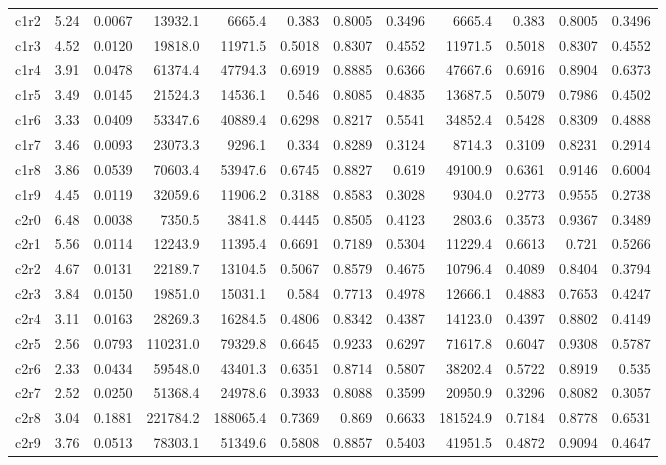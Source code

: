 \begin{landscape}
\begin{longtable}[]{@{}lrrrrrrrrrrr@{}}
c1r2 & 5.24 & 0.0067 & 13932.1 & 6665.4 & 0.383 & 0.8005 & 0.3496 & 6665.4 & 0.383 & 0.8005 & 0.3496 \\
c1r3 & 4.52 & 0.0120 & 19818.0 & 11971.5 & 0.5018 & 0.8307 & 0.4552 & 11971.5 & 0.5018 & 0.8307 & 0.4552 \\
c1r4 & 3.91 & 0.0478 & 61374.4 & 47794.3 & 0.6919 & 0.8885 & 0.6366 & 47667.6 & 0.6916 & 0.8904 & 0.6373 \\
c1r5 & 3.49 & 0.0145 & 21524.3 & 14536.1 & 0.546 & 0.8085 & 0.4835 & 13687.5 & 0.5079 & 0.7986 & 0.4502 \\
c1r6 & 3.33 & 0.0409 & 53347.6 & 40889.4 & 0.6298 & 0.8217 & 0.5541 & 34852.4 & 0.5428 & 0.8309 & 0.4888 \\
c1r7 & 3.46 & 0.0093 & 23073.3 & 9296.1 & 0.334 & 0.8289 & 0.3124 & 8714.3 & 0.3109 & 0.8231 & 0.2914 \\
c1r8 & 3.86 & 0.0539 & 70603.4 & 53947.6 & 0.6745 & 0.8827 & 0.619 & 49100.9 & 0.6361 & 0.9146 & 0.6004 \\
c1r9 & 4.45 & 0.0119 & 32059.6 & 11906.2 & 0.3188 & 0.8583 & 0.3028 & 9304.0 & 0.2773 & 0.9555 & 0.2738 \\
c2r0 & 6.48 & 0.0038 & 7350.5 & 3841.8 & 0.4445 & 0.8505 & 0.4123 & 2803.6 & 0.3573 & 0.9367 & 0.3489 \\
c2r1 & 5.56 & 0.0114 & 12243.9 & 11395.4 & 0.6691 & 0.7189 & 0.5304 & 11229.4 & 0.6613 & 0.721 & 0.5266 \\
c2r2 & 4.67 & 0.0131 & 22189.7 & 13104.5 & 0.5067 & 0.8579 & 0.4675 & 10796.4 & 0.4089 & 0.8404 & 0.3794 \\
c2r3 & 3.84 & 0.0150 & 19851.0 & 15031.1 & 0.584 & 0.7713 & 0.4978 & 12666.1 & 0.4883 & 0.7653 & 0.4247 \\
c2r4 & 3.11 & 0.0163 & 28269.3 & 16284.5 & 0.4806 & 0.8342 & 0.4387 & 14123.0 & 0.4397 & 0.8802 & 0.4149 \\
c2r5 & 2.56 & 0.0793 & 110231.0 & 79329.8 & 0.6645 & 0.9233 & 0.6297 & 71617.8 & 0.6047 & 0.9308 & 0.5787 \\
c2r6 & 2.33 & 0.0434 & 59548.0 & 43401.3 & 0.6351 & 0.8714 & 0.5807 & 38202.4 & 0.5722 & 0.8919 & 0.535 \\
c2r7 & 2.52 & 0.0250 & 51368.4 & 24978.6 & 0.3933 & 0.8088 & 0.3599 & 20950.9 & 0.3296 & 0.8082 & 0.3057 \\
c2r8 & 3.04 & 0.1881 & 221784.2 & 188065.4 & 0.7369 & 0.869 & 0.6633 & 181524.9 & 0.7184 & 0.8778 & 0.6531 \\
c2r9 & 3.76 & 0.0513 & 78303.1 & 51349.6 & 0.5808 & 0.8857 & 0.5403 & 41951.5 & 0.4872 & 0.9094 & 0.4647 \\

\end{longtable}
\end{landscape}
